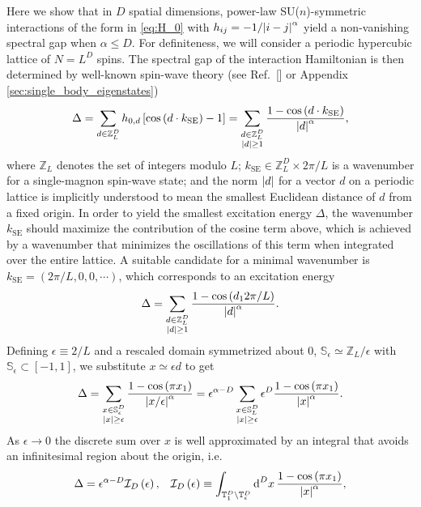 \documentclass[nofootinbib,notitlepage,11pt]{revtex4-2}
\renewcommand{\t}{\text} %
\newcommand{\f}[2]{\dfrac{#1}{#2}} %
\newcommand{\p}[1]{\left(#1\right)} %
\renewcommand{\sp}[1]{\left[#1\right]} %
\renewcommand{\c}{\cdot} %
\newcommand{\1}{\mathds{1}}
\renewcommand{\d}{\text{d}}
\newcommand{\I}{\mathcal{I}}
\renewcommand{\SS}{\mathbb{S}}
\newcommand{\TT}{\mathbb{T}}
\newcommand{\ZZ}{\mathbb{Z}}
\begin{document}
Here we show that in $D$ spatial dimensions, power-law SU($n$)-symmetric interactions of the form in \eqref{eq:H_0} with $h_{ij}=-1/\abs{i-j}^\alpha$ yield a non-vanishing spectral gap when $\alpha\le D$.
For definiteness, we will consider a periodic hypercubic lattice of $N=L^D$ spins.
The spectral gap of the interaction Hamiltonian is then determined by well-known spin-wave theory (see Ref.~[] or Appendix \ref{sec:single_body_eigenstates})
\begin{align}
  \Delta
  = \sum_{d\in\ZZ_L^D} h_{0,d} \sp{\cos\p{d \c k_{\t{SE}}}-1}
  = \sum_{\substack{d\in\ZZ_L^D\\\abs{d}\ge1}}
  \f{1-\cos\p{d \c k_{\t{SE}}}}{\abs{d}^\alpha},
\end{align}
where $\ZZ_L$ denotes the set of integers modulo $L$; $k_{\t{SE}}\in\ZZ_L^D\times2\pi/L$ is a wavenumber for a single-magnon spin-wave state; and the norm $\abs{d}$ for a vector $d$ on a periodic lattice is implicitly understood to mean the smallest Euclidean distance of $d$ from a fixed origin.
In order to yield the smallest excitation energy $\Delta$, the wavenumber $k_{\t{SE}}$ should maximize the contribution of the cosine term above, which is achieved by a wavenumber that minimizes the oscillations of this term when integrated over the entire lattice.
A suitable candidate for a minimal wavenumber is $k_{\t{SE}}=\p{2\pi/L,0,0,\cdots}$, which corresponds to an excitation energy
\begin{align}
  \Delta = \sum_{\substack{d\in\ZZ_L^D\\\abs{d}\ge1}}
  \f{1-\cos\p{d_12\pi/L}}{\abs{d}^\alpha}.
\end{align}
Defining $\epsilon\equiv2/L$ and a rescaled domain symmetrized about $0$, $\SS_\epsilon\simeq\ZZ_L/\epsilon$ with $\SS_\epsilon\subset\sp{-1,1}$, we substitute $x\simeq\epsilon d$ to get
\begin{align}
  \Delta
  = \sum_{\substack{x\in\SS_\epsilon^D\\\abs{x}\ge\epsilon}}
  \f{1-\cos\p{\pi x_1}}{\abs{x/\epsilon}^\alpha}
  = \epsilon^{\alpha-D} \sum_{\substack{x\in\SS_L^D\\\abs{x}\ge\epsilon}}
  \epsilon^D \f{1-\cos\p{\pi x_1}}{\abs{x}^\alpha}.
\end{align}
As $\epsilon\to0$ the discrete sum over $x$ is well approximated by an integral that avoids an infinitesimal region about the origin, i.e.
\begin{align}
  \Delta = \epsilon^{\alpha-D} \I_D\p{\epsilon},
  &&
  \I_D\p{\epsilon}
  \equiv \int_{\TT_1^D\setminus\TT_\epsilon^D} \d^Dx\,
  \f{1-\cos\p{\pi x_1}}{\abs{x}^\alpha},
\end{align}
\end{document}

